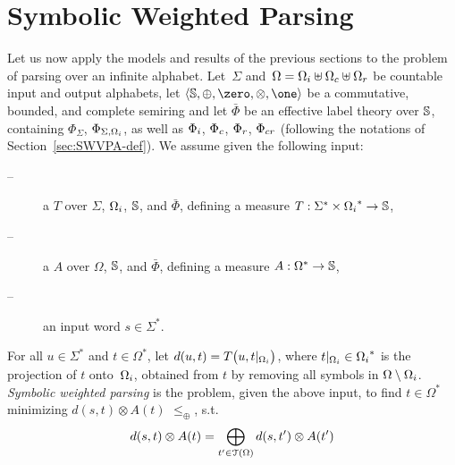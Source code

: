 \section{Symbolic Weighted Parsing}
\label{sec:parsing}

Let us now apply the models and results of the previous sections %
to the problem of parsing over an infinite alphabet. %
%
%
Let~$\Sigma$
and~$\Omega = \Omegai \uplus \Omegac \uplus \Omegar$
be countable input and output alphabets,
let $\< \Semiring, \oplus, \zero, \otimes, \one>$ be a
commutative, bounded, and complete  semiring
and let $\bar\Phi$ be an effective label theory over $\mathbb{S}$,
containing $\Phi_\Sigma$, $\Phi_{\Sigma, \Omegai}$, as well as
$\Phii$, $\Phic$, $\Phir$, $\Phicr$
(following the notations of Section~\ref{sec:SWVPA-def}).
%
\noindent
We assume given the following input:
\begin{description}
\item[--] a \SWT $T$ over $\Sigma$, $\Omegai$, $\mathbb{S}$, and $\bar\Phi$,
defining a measure %
$T: \Sigma^* \times \Omegai^* \to \Semiring$,

\item[--] a \SWVPA $A$ over $\Omega$, $\mathbb{S}$, and $\bar\Phi$,
defining a measure $A: \Omega^* \to \mathbb{S}$,
\item[--] an input word $s \in \Sigma^*$.
\end{description}
%
For all $u \in \Sigma^*$ and $t \in \Omega^*$, let
\(d(u, t) = T\bigl(u, t|_\Omegai \bigr)\),
where $t|_\Omegai \in \Omegai^*$ is the projection of $t$ onto~$\Omegai$,
obtained from $t$ by removing all symbols in $\Omega \setminus \Omegai$.
%
\noindent
\emph{Symbolic weighted parsing} is the problem,
given the above input,
to find $t \in \Omega^*$ %
minimizing \( d(s, t) \otimes A(t)\)
\wrt $\leq_\oplus$,
\ie s.t. %
%
\begin{equation}\label{eq:distance-lang}
d(s, t) \otimes A(t) = \displaystyle\bigoplus_{t' \in \mathcal{T}(\Omega)} d(s, t') \otimes A(t')
\end{equation}
